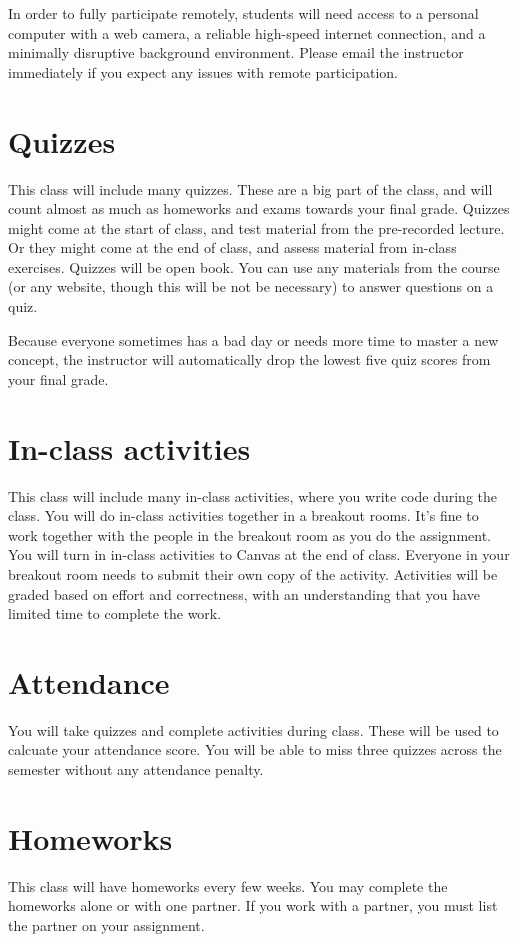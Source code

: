 \documentclass[10pt]{memoir}
\begin{document}
In order to fully participate remotely, students will need access to a personal computer with a web camera, a reliable high-speed internet connection, and a minimally disruptive background environment. Please email the instructor immediately if you expect any issues with remote participation.

\section{\textbf{Quizzes}}

This class will include many quizzes. These are a big part of the class, and will count almost as much as homeworks and exams towards your final grade. Quizzes might come at the start of class, and test material from the pre-recorded lecture. Or they might come at the end of class, and assess material from in-class exercises. Quizzes will be open book. You can use any materials from the course (or any website, though this will be not be necessary) to answer questions on a quiz. 

Because everyone sometimes has a bad day or needs more time to master a new concept, the instructor will automatically drop the lowest five quiz scores from your final grade. 

\section{\textbf{In-class activities}}
This class will include many in-class activities, where you write code during the class. You will do in-class activities together in a breakout rooms. It's fine to work together with the people in the breakout room as you do the assignment. You will turn in in-class activities to Canvas at the end of class. Everyone in your breakout room needs to submit their own copy of the activity. Activities will be graded based on effort and correctness, with an understanding that you have limited time to complete the work. 

\section{\textbf{Attendance}}
You will take quizzes and complete activities during class. These will be used to calcuate your attendance score. You will be able to miss three quizzes across the semester without any attendance penalty. 

\section{\textbf{Homeworks}}
This class will have homeworks every few weeks. You may complete the homeworks alone or with one partner. If you work with a partner, you must list the partner on your assignment. 
\end{document}
